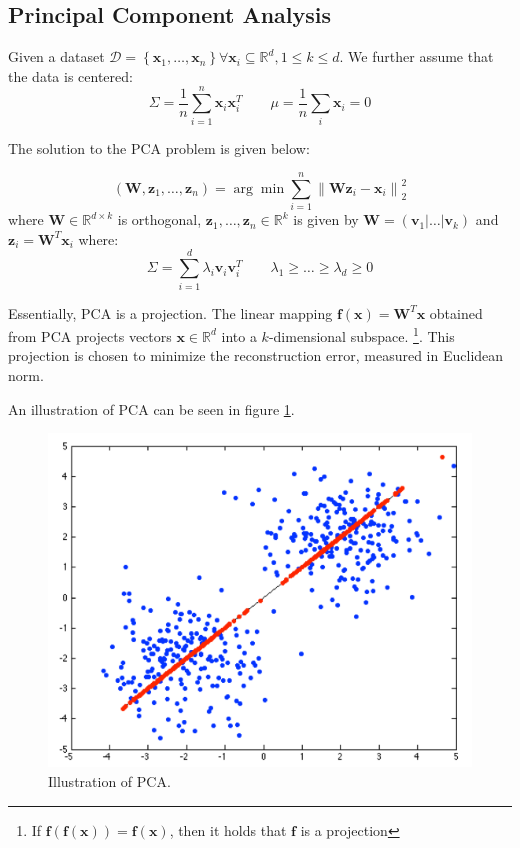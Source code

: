 \documentclass[a4paper,10pt,twoside]{article}
\newcommand\norm[1]{\left\lVert#1\right\rVert}
\begin{document}
\subsection{Principal Component Analysis}

Given a dataset $\mathcal{D}=\left\{\mathbf{x}_1,\ldots, \mathbf{x}_n\right\}\forall\mathbf{x}_i\subseteq\mathbb{R}^{d}, 1\leq k\leq d$. We further assume that the data is centered:
\begin{equation*}
    \Sigma = \frac{1}{n}\sum_{i=1}^{n}\mathbf{x}_i\mathbf{x}_i^T \qquad \mu = \frac{1}{n}\sum_{i}\mathbf{x}_i=0
\end{equation*}

The solution to the PCA problem is given below:

\begin{equation*}
    (\mathbf{W}, \mathbf{z}_1, \ldots, \mathbf{z}_n)=\arg\min\sum_{i=1}^{n}\norm{\mathbf{W}\mathbf{z}_i-\mathbf{x}_i}^2_2
\end{equation*}
where $\mathbf{W}\in\mathbb{R}^{d\times k}$ is orthogonal, $\mathbf{z}_1, \ldots, \mathbf{z}_n\in\mathbb{R}^k$ is given by $\mathbf{W}=(\mathbf{v}_1|\ldots|\mathbf{v}_k)$ and $\mathbf{z}_i=\mathbf{W}^T\mathbf{x}_i$ where:
\begin{equation*}
    \Sigma = \sum_{i=1}^{d}\lambda_i\mathbf{v}_i\mathbf{v}_i^T \qquad \lambda_1\geq \ldots\geq \lambda_d\geq 0
\end{equation*}

Essentially, PCA is a projection. The linear mapping $\mathbf{f}(\mathbf{x})=\mathbf{W}^T\mathbf{x}$ obtained from PCA projects vectors $\mathbf{x}\in\mathbb{R}^d$ into a $k$-dimensional subspace. \footnote{If $\mathbf{f}(\mathbf{f}(\mathbf{x}))=\mathbf{f}(\mathbf{x})$, then it holds that $\mathbf{f}$ is a projection}. This projection is chosen to minimize the reconstruction error, measured in Euclidean norm.

An illustration of PCA can be seen in figure \ref{pca_illustration}.

\begin{figure}
    \centering
    \includegraphics[width=.5\textwidth]{figures/pca-illustration.png}
    \caption{Illustration of PCA.}
    \label{pca_illustration}
\end{figure}
\end{document}
